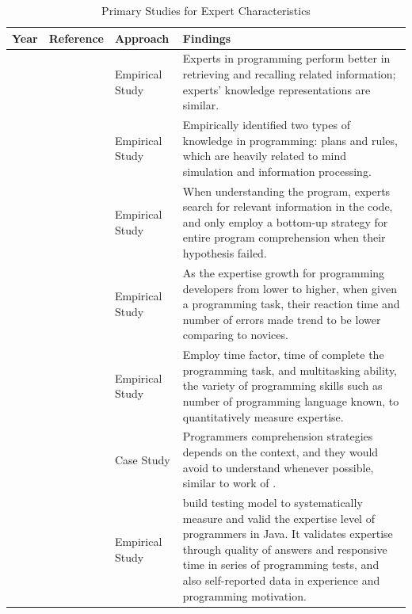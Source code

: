 \begin{table}[htbp]
\centering
\small
\settowidth{}
\begin{tabulary}{\textwidth}{LLLL}
\hline
\textbf{Year}           & \textbf{Reference}          & \textbf{Approach}           & \textbf{Findings} \\ \hline
\citeyear{MCKEITHEN1981307} & \citeauthor{MCKEITHEN1981307}\cite{MCKEITHEN1981307} & Empirical Study & Experts in programming perform better in retrieving and recalling related information; experts' knowledge representations are similar.\\ \hline

\citeyear{soloway1984empirical} & \citeauthor{soloway1984empirical}\cite{soloway1984empirical} & Empirical Study & Empirically identified two types of knowledge in programming: plans and rules, which are heavily related to mind simulation and information processing. \\ \hline

\citeyear{koenemann1991expert} & \citeauthor{koenemann1991expert}\cite{koenemann1991expert} & Empirical Study & When understanding the program, experts search for relevant information in the code, and only employ a bottom-up strategy for entire program comprehension when their hypothesis failed.\\ \hline

\citeyear{davies1994knowledge} &\citeauthor{davies1994knowledge}\cite{davies1994knowledge} & Empirical Study & As the expertise growth for programming developers from lower to higher, when given a programming task, their reaction time and number of errors made trend to be lower comparing to novices.\\ \hline

\citeyear{stanislaw1994note} &\citeauthor{stanislaw1994note}\cite{stanislaw1994note} & Empirical Study & Employ time factor, time of complete the programming task, and multitasking ability, the variety of programming skills such as number of programming language known, to quantitatively measure expertise.\\\hline

\citeyear{maalej2014comprehension} & \citeauthor{maalej2014comprehension}\cite{maalej2014comprehension} & Case Study & Programmers comprehension strategies depends on the context, and they would avoid to understand whenever possible, similar to work of \citeauthor{koenemann1991expert}.\\\hline

\citeyear{bergersen2014construction} &\citeauthor{bergersen2014construction}\cite{bergersen2014construction} & Empirical Study & \citeauthor{bergersen2014construction} build testing model to systematically measure and valid the expertise level of programmers in Java. It validates expertise through quality of answers and responsive time in series of programming tests, and also self-reported data in experience and programming motivation.\\ \hline

\end{tabulary}
\caption{Primary Studies for Expert Characteristics}
\label{tab:expertCharacteristics}
\end{table}

